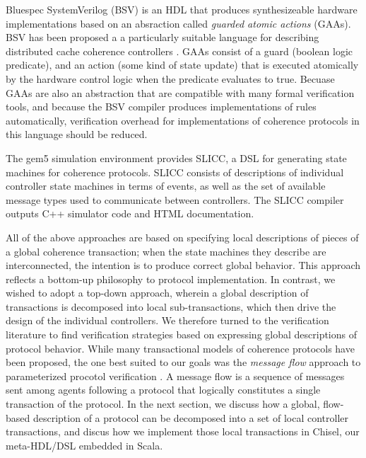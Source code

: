 Bluespec SystemVerilog (BSV) \cite{bluespec}
is an HDL that produces synthesizeable hardware implementations based on an absraction called \emph{guarded atomic actions} (GAAs).
BSV has been proposed a a particularly suitable language for describing distributed cache coherence controllers \cite{dave-memocode05}.
GAAs consist of a guard (boolean logic predicate), and an action (some kind of state update)
that is executed atomically by the hardware control logic when the predicate evaluates to true.
Becuase GAAs are also an abstraction that are compatible with many formal verification tools,
and because the BSV compiler produces implementations of rules automatically,
verification overhead for implementations of coherence protocols in this language should be reduced.

The gem5 simulation environment \cite{binkert-sigarch11}
provides SLICC, a DSL for generating state machines for coherence protocols.
SLICC consists of descriptions of individual controller state machines in terms of events, as well as the set of available message types
used to communicate between controllers.
The SLICC compiler outputs C++ simulator code and HTML documentation.

All of the above approaches are based on specifying local descriptions of pieces of a global coherence transaction;
when the state machines they describe are interconnected, the intention is to produce correct global behavior.
This approach reflects a bottom-up philosophy to protocol implementation.
In contrast, we wished to adopt a top-down approach, wherein a global description of transactions
is decomposed into local sub-transactions, which then drive the design of the individual controllers.
We therefore turned to the verification literature to find verification strategies based on expressing global descriptions of protocol behavior.
While many transactional models of coherence protocols have been proposed,
the one best suited to our goals was the \emph{message flow} approach to parameterized procotol verification
\cite{talupur2008going, oleary-fmcad09}.
A message flow is a sequence of messages sent among agents following a protocol that
logically constitutes a single transaction of the protocol. 
In the next section, we discuss how a global, flow-based description of a protocol can be decomposed into a set
of local controller transactions, and discus how we implement those local transactions in Chisel,
our meta-HDL/DSL embedded in Scala.

